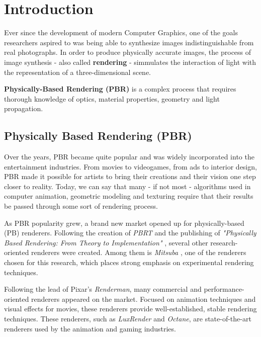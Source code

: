 \section{Introduction}

Ever since the development of modern Computer Graphics, one of the goals 
researchers aspired to was being able to synthesize images indistinguishable 
from real photographs. In order to produce physically accurate images, the 
process of image synthesis - also called \textbf{rendering} - simmulates the 
interaction of light with the representation of a three-dimensional scene. 

\textbf{Physically-Based Rendering (PBR)} is a complex process that requires 
thorough knowledge of optics, material properties, geometry and light 
propagation.

\subsection{Physically Based Rendering (PBR)}
Over the years, PBR became quite popular and was widely incorporated into the 
entertainment industries. From movies to videogames, from ads to interior 
design, PBR made it possible for artists to bring their creations and their 
vision one step closer to reality. Today, we can say that many - if not most - 
algorithms used in computer animation, geometric modeling and texturing require 
that their results be passed through some sort of rendering process.

As PBR popularity grew, a brand new market opened up for physically-based (PB) 
renderers. Following the creation of \textit{PBRT} \cite{pbrt} and the publishing of 
\textit{"Physically Based Rendering: From Theory to Implementation"} 
\cite{pbrtBook}, several other research-oriented renderers were created. Among them 
is \textit{Mitsuba} \cite{mitsuba}, one of the renderers chosen for this research, which places 
strong emphasis on experimental rendering techniques.

Following the lead of Pixar's \textit{Renderman}, many 
commercial and performance-oriented renderers appeared on the market. Focused on 
animation techniques and visual effects for movies, these renderers provide 
well-established, stable rendering techniques. These renderers, such as 
\textit{LuxRender} \cite{luxrender} and \textit{Octane}, are 
state-of-the-art renderers used by the animation and gaming industries.

